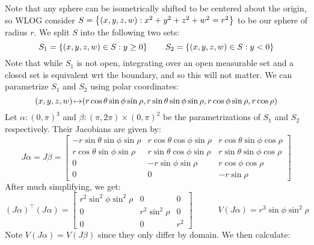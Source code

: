 \begin{soln}
    Note that any sphere can be isometrically shifted to be centered about the
    origin, so WLOG consider $ S = \left\{{(x, y, z, w) :
    x^{2}+y^{2}+z^{2}+w^{2} = r^{2}}\right\} $ to be our sphere of radius $ r $.
    We split $ S $ into the following two sets:
    \begin{equation*}
        S_{1} = \left\{{(x, y, z, w) \in S : y \geq 0}\right\} \qquad
        S_{2} = \left\{{(x, y, z, w) \in S : y < 0}\right\}
    \end{equation*}
    Note that while $ S_{1} $ is not open, integrating over an open measurable
    set and a closed set is equivalent wrt the boundary, and so this will not
    matter. \vsp
    We can parametrize $ S_{1} $ and $ S_{2} $ using polar coordinates:
    \begin{equation*}
        (x, y, z, w) \operatorname{\mapsto} (r\cos\theta\sin\phi\sin\rho,
        r\sin\theta\sin\phi\sin\rho,
        r\cos\phi\sin\rho, r\cos\rho)
    \end{equation*}
    Let $ \alpha: (0, \pi)^{3} $ and $ \beta : (\pi, 2\pi) \times (0, \pi)^{2} $
    be the parametrizations of $ S_{1} $ and $ S_{2} $ respectively.
    Their Jacobians are given by:
    \begin{equation*}
        J\alpha = J\beta =
        \begin{bmatrix}
            -r\sin\theta\sin\phi\sin\rho & r\cos\theta\cos\phi\sin\rho &
            r\cos\theta\sin\phi\cos\rho \\
            r\cos\theta\sin\phi\sin\rho & r\sin\theta\cos\phi\sin\rho &
            r\sin\theta\sin\phi\cos\rho \\
            0 & -r\sin\phi\sin\rho & r\cos\phi\cos\rho \\
            0 & 0 & -r\sin\rho
        \end{bmatrix}
    \end{equation*}
    After much simplifying, we get:
    \begin{equation*}
        (J\alpha)^{\intercal}(J\alpha) =
        \begin{bmatrix}
            r^{2}\sin^{2}\phi\sin^{2}\rho & 0 & 0 \\
            0 & r^{2}\sin^{2}\rho & 0 \\
            0 & 0 & r^{2}
        \end{bmatrix} \qquad \quad
        V(J\alpha) = r^{3}\sin\phi\sin^{2}\rho
    \end{equation*}
    Note $ V(J\alpha) = V(J\beta) $ since they only differ by domain.
    We then calculate:

\end{soln}
